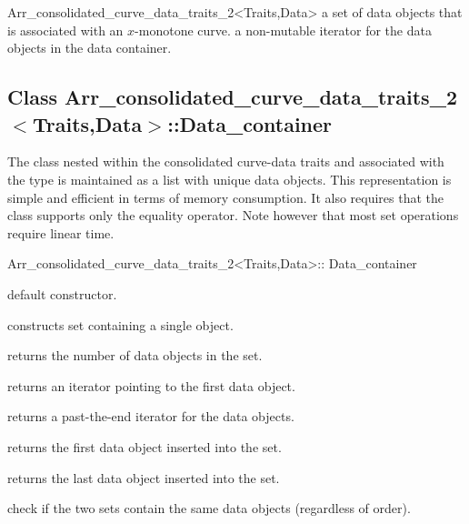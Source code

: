 \begin{ccRefClass}{Arr_consolidated_curve_data_traits_2<Traits,Data>}
    {a set of data objects that is associated with an $x$-monotone curve.}
\ccGlue
{}
    {a non-mutable iterator for the data objects in the data container.}

\subsection*{Class Arr\_consolidated\_curve\_data\_traits\_2$<$Traits,Data$>$::Data\_container}

The  class nested within the consolidated 
curve-data traits and associated with the 
type is maintained as a list with unique data objects. This representation is
simple and efficient in terms of memory consumption. It also requires that
the  class supports only the equality operator. Note however that
most set operations require linear time.

\begin{ccClass}{Arr_consolidated_curve_data_traits_2<Traits,Data>::
                Data_container}

\ccCreation
{}

    {default constructor.}

    {constructs set containing a single  object.}

\ccAccessFunctions

  {returns the number of data objects in the set.}

  {returns an iterator pointing to the first data object.}

  {returns a past-the-end iterator for the data objects.}

  {returns the first data object inserted into the set.
   }

  {returns the last data object inserted into the set.
   }

\ccPredicates

  {check if the two sets contain the same data objects (regardless of order).}


\end{ccClass}
\end{ccRefClass}
